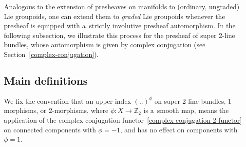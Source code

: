 \documentclass[pdftex]{sigma}
\numberwithin{equation}{section}
\def\Z {\mathbb{Z}}
\begin{document}
Analogous to the extension of presheaves on manifolds to (ordinary, ungraded) Lie groupoids, one can extend them to \emph{graded} Lie groupoids whenever the presheaf is equipped with a~strictly involutive presheaf automorphism. In the following subsection, we illustrate this process for the presheaf of super 2-line bundles, whose automorphism is given by complex conjugation (see Section~\ref{complex-conjugation}).

\subsection{Main definitions}
\label{graded-equivariant-definitions}

We fix the convention that an upper index $(..)^{\phi}$ on super 2-line bundles, 1-morphisms, or 2-morphisms, where $\phi\colon X \to \Z_2$ is a~smooth map, means the application of the complex conjugation functor~\eqref{complex-conjugation-2-functor} on connected components with $\phi=-1$, and has no effect on components with $\phi=1$.
\end{document}
